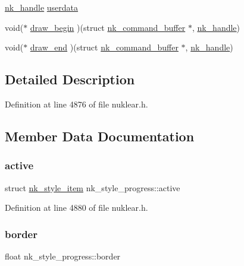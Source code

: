 \begin{DoxyCompactItemize}
\item 
\mbox{\hyperlink{unionnk__handle}{nk\+\_\+handle}} \mbox{\hyperlink{structnk__style__progress_af990f8b225eba54c3ad6b0137e619584}{userdata}}
\item 
void($\ast$ \mbox{\hyperlink{structnk__style__progress_a8ad1b31c585c9146d1cdb5956edae910}{draw\+\_\+begin}} )(struct \mbox{\hyperlink{structnk__command__buffer}{nk\+\_\+command\+\_\+buffer}} $\ast$, \mbox{\hyperlink{unionnk__handle}{nk\+\_\+handle}})
\item 
void($\ast$ \mbox{\hyperlink{structnk__style__progress_a81cf48d7ef586bbe7ec6144e9e78541c}{draw\+\_\+end}} )(struct \mbox{\hyperlink{structnk__command__buffer}{nk\+\_\+command\+\_\+buffer}} $\ast$, \mbox{\hyperlink{unionnk__handle}{nk\+\_\+handle}})
\end{DoxyCompactItemize}


\subsection{Detailed Description}


Definition at line 4876 of file nuklear.\+h.



\subsection{Member Data Documentation}
\mbox{\label{structnk__style__progress_abb453eddb9a214da99d749f607d5623e}} 
\subsubsection{\texorpdfstring{active}{active}}
{\footnotesize\ttfamily struct \mbox{\hyperlink{structnk__style__item}{nk\+\_\+style\+\_\+item}} nk\+\_\+style\+\_\+progress\+::active}



Definition at line 4880 of file nuklear.\+h.

\mbox{\label{structnk__style__progress_aca84031f1ab9dc33c61e33114927a14f}} 
\subsubsection{\texorpdfstring{border}{border}}
{\footnotesize\ttfamily float nk\+\_\+style\+\_\+progress\+::border}



